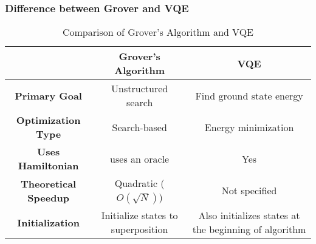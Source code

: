 \documentclass{Assignment}
\begin{document}
\subsubsection*{Difference between Grover and VQE}
\begin{table}[hbt!]
	\centering
	\caption{Comparison of Grover's Algorithm and VQE}
	\label{tab:grover_vqe_comparison}
	\begin{adjustbox}{max width=\textwidth}
		\begin{tabular}{|c|c|c|}
			\toprule
		
			& \textbf{Grover's Algorithm} & \textbf{VQE} \\
			\midrule
			\textbf{Primary Goal} & Unstructured search & Find ground state energy \\
			\hline
			\textbf{Optimization Type} & Search-based & Energy minimization \\
			\hline
			\textbf{Uses Hamiltonian} &uses an oracle & Yes \\
			\hline
			\textbf{Theoretical Speedup} & Quadratic ($O(\sqrt{N})$) & Not specified\\
	
			\hline
			\textbf{Initialization} & Initialize states to superposition & Also initializes states at the beginning of algorithm  \\
			\bottomrule
		\end{tabular}
	\end{adjustbox}
\end{table}
\end{document}
